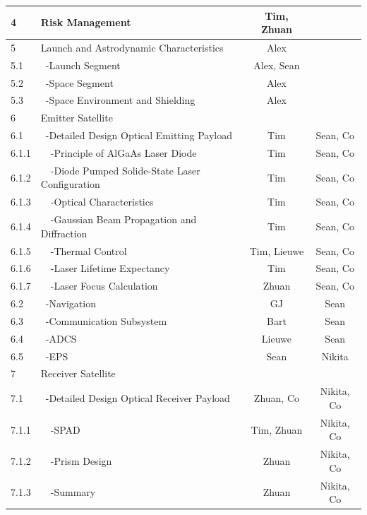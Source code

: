 \begin{center}
\begin{longtable}{|l|l|c|c|}
 4       & Risk Management                      & Tim, Zhuan & \\\hline\hline
 5       & Launch and Astrodynamic Characteristics & Alex &\\\hline
 5.1     & \ -Launch Segment                    & Alex, Sean &\\\hline
 5.2     & \ -Space Segment                     & Alex &\\\hline
 5.3     & \ -Space Environment and Shielding   & Alex &\\\hline\hline
 6       & Emitter Satellite                     &&\\\hline
 6.1     & \ -Detailed Design Optical Emitting Payload & Tim & Sean, Co \\\hline
 6.1.1   & \ \ -Principle of AlGaAs Laser Diode & Tim & Sean, Co \\\hline
 6.1.2   & \ \ -Diode Pumped Solide-State Laser Configuration & Tim & Sean, Co \\\hline
 6.1.3   & \ \ -Optical Characteristics        & Tim & Sean, Co\\\hline
 6.1.4   & \ \ -Gaussian Beam Propagation and Diffraction & Tim &  Sean, Co\\\hline  
 6.1.5   & \ \ -Thermal Control                & Tim, Lieuwe & Sean, Co\\\hline
 6.1.6   & \ \ -Laser Lifetime Expectancy     & Tim & Sean, Co\\\hline
 6.1.7   & \ \ -Laser Focus Calculation        & Zhuan & Sean, Co\\\hline
 6.2     & \ -Navigation                        & GJ & Sean \\\hline
 6.3     & \ -Communication Subsystem           & Bart & Sean\\\hline
 6.4     & \ -ADCS                              & Lieuwe & Sean\\\hline
 6.5     & \ -EPS                               & Sean & Nikita\\\hline
 7       & Receiver Satellite                           &&\\\hline
 7.1     & \ -Detailed Design Optical Receiver Payload & Zhuan, Co & Nikita, Co\\\hline
 7.1.1   & \ \ -SPAD                           & Tim, Zhuan & Nikita, Co\\\hline
 7.1.2   & \ \ -Prism Design                   & Zhuan & Nikita, Co\\\hline
 7.1.3   & \ \ -Summary                        & Zhuan & Nikita, Co\\\hline

\end{longtable}
\end{center}
